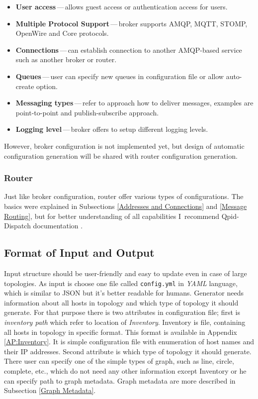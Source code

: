 \begin{itemize}
	\setlength\itemsep{0em}
	\item \textbf{User access}\,---\,allows guest access or authentication access for users. 
	\item \textbf{Multiple Protocol Support}\,---\,broker supports AMQP, MQTT, STOMP, OpenWire and Core protocols.
	\item \textbf{Connections}\,---\,can establish connection to another AMQP-based service such as another broker or router.
	\item \textbf{Queues}\,---\,user can specify new queues in configuration file or allow auto-create option.
	\item \textbf{Messaging types}\,---\,refer to approach how to deliver messages, examples are point-to-point and publish-subscribe approach.
	\item \textbf{Logging level}\,---\,broker offers to setup different logging levels.
\end{itemize}
However, broker configuration is not implemented yet, but design of automatic configuration generation will be shared with router configuration generation.

\subsubsection*{Router}
Just like broker configuration, router offer various types of configurations. The basics were explained in Subsections \ref{Addresses and Connections} and \ref{Message Routing}, but for better understanding of all capabilities I~recommend Qpid-Dispatch documentation \cite{RH:Interconnect}. 

\subsection{Format of Input and Output}
Input structure should be user-friendly and easy to update even in case of large topologies. As input is choose one file called \texttt{config.yml} in \emph{YAML}\footnotemark{}  language, which is similar to JSON but it's better readable for humans. Generator needs information about all hosts in topology and which type of topology it should generate. For that purpose there is two attributes in configuration file; first is \emph{inventory path} which refer to location of \emph{Inventory}. Inventory is file, containing all hosts in topology in specific format. This format is available in Appendix \ref{AP:Inventory}. It is simple configuration file with enumeration of host names and their IP addresses. Second attribute is which type of topology it should generate. There user can specify one of the simple types of graph, such as line, circle, complete, etc., which do not need any other information except Inventory or he can specify path to graph metadata. Graph metadata are more described in Subsection \ref{Graph Metadata}.

